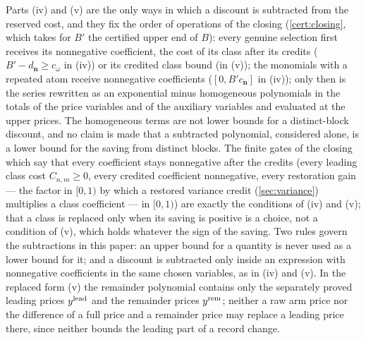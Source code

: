 \begin{remark}\label{rem:completion-subtraction}
Parts (iv) and (v) are the only ways in which a discount is subtracted from
the reserved cost, and they fix the order of operations of the closing
(\cref{cert:closing}, which takes for $B'$ the certified upper end of $B$):
every genuine selection first receives its nonnegative coefficient, the cost
of its class after its credits ($B'-d_{\boldsymbol n}\ge c_\omega$ in (iv)) or
its credited class bound (in (v)); the monomials with a repeated atom receive
nonnegative coefficients ($[0,B'c_{\boldsymbol n}]$ in (iv)); only then is the
series rewritten as an exponential minus homogeneous polynomials in the
totals of the price variables and of the auxiliary variables and evaluated at
the upper prices. The homogeneous terms are not lower bounds for a
distinct-block discount, and no claim is made that a subtracted polynomial,
considered alone, is a lower bound for the saving from distinct blocks.
The finite gates of the closing which say that every coefficient
stays nonnegative after the credits (every leading class cost $C_{n,m}\ge0$,
every credited coefficient nonnegative, every restoration gain
--- the factor in $[0,1)$ by which a restored variance credit
(\cref{sec:variance}) multiplies a class coefficient --- in
$[0,1)$) are
exactly the conditions of (iv) and (v); that a class is replaced only when
its saving is positive is a choice, not a condition of (v), which holds
whatever the sign of the saving. Two rules govern the subtractions in this
paper: an upper bound for a
quantity is never used as a lower bound for it; and a discount is subtracted
only inside an expression with nonnegative coefficients in the same chosen
variables, as in (iv) and (v). In the replaced form (v) the remainder
polynomial contains only the separately proved leading prices $y^{\rm lead}$
and the remainder prices $y^{\rm rem}$; neither a raw arm price nor the
difference of a full price and a remainder price may replace a leading price
there, since neither bounds the leading part of a record change.


\end{remark}
